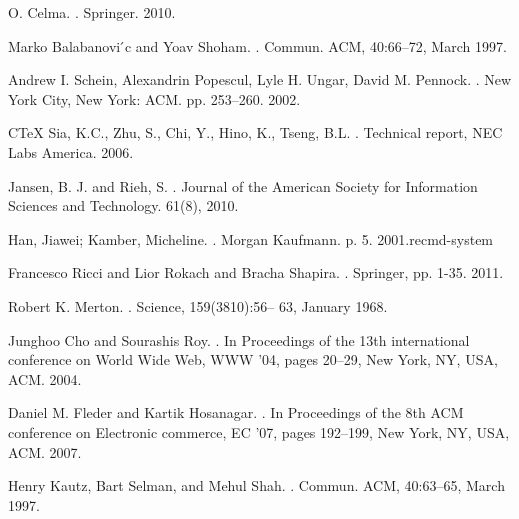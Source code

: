 \begin{thebibliography}{10}
O. Celma.
.
\newblock Springer. 2010.

Marko Balabanovi ́c and Yoav Shoham.
.
\newblock Commun. ACM, 40:66–72, March 1997.

Andrew I. Schein, Alexandrin Popescul, Lyle H. Ungar, David M. Pennock.
.
\newblock New York City, New York: ACM. pp. 253–260. 2002.

C\TeX{} Sia, K.C., Zhu, S., Chi, Y., Hino, K., Tseng, B.L.
.
\newblock Technical report, NEC Labs America. 2006.

Jansen, B. J. and Rieh, S.
.
\newblock Journal of the American Society for Information Sciences and Technology. 61(8), 2010.

Han, Jiawei; Kamber, Micheline.
.
\newblock Morgan Kaufmann. p. 5. 2001.recmd-system

Francesco Ricci and Lior Rokach and Bracha Shapira.
.
\newblock Springer, pp. 1-35. 2011.

Robert K. Merton.
.
\newblock Science, 159(3810):56– 63, January 1968.

Junghoo Cho and Sourashis Roy.
.
\newblock In Proceedings of the 13th international conference on World Wide Web, WWW ’04, pages 20–29, New York, NY, USA, ACM. 2004.

Daniel M. Fleder and Kartik Hosanagar.
.
\newblock In Proceedings of the 8th ACM conference on Electronic commerce, EC ’07, pages 192–199, New York, NY, USA, ACM. 2007.

Henry Kautz, Bart Selman, and Mehul Shah.
.
\newblock Commun. ACM, 40:63–65, March 1997.


\end{thebibliography}

